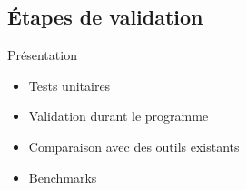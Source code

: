 \subsection{\'Etapes de validation}
\begin{frame}
  \begin{block}{Pr\'esentation}
    \begin{itemize}
      \item Tests unitaires
      \item Validation durant le programme
      \item Comparaison avec des outils existants
      \item Benchmarks
    \end{itemize}
  \end{block}
\end{frame}

